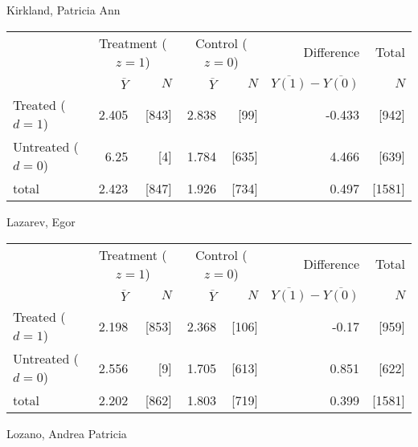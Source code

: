 \documentclass[11pt,notitlepage]{article}
\begin{document}
\clearpage

Kirkland, Patricia Ann

\begin{table}[h!]
\begin{center}
\begin{tabular}{l|rr|rr|rr}
  \hline
 & \multicolumn{2}{c|}{Treatment ($z=1$)} & \multicolumn{2}{c|}{Control ($z=0$)} & Difference & Total \\
 & $\overline{Y}$ & $N$ & $\overline{Y}$ & $N$ & $\overline{Y(1)} - \overline{Y(0)}$ & $N$ \\ 
  \hline
Treated ($d=1$) &  2.405 & [843] & 2.838 & [99] & -0.433 & [942] \\ 
  Untreated ($d=0$) & 6.25 & [4] & 1.784 & [635] & 4.466 & [639] \\ 
  \hline
  total & 2.423 & [847] & 1.926 & [734] & 0.497 & [1581] \\ 
   \hline
\end{tabular}
\end{center}
\end{table}
Lazarev, Egor

\begin{table}[h!]
\begin{center}
\begin{tabular}{l|rr|rr|rr}
  \hline
 & \multicolumn{2}{c|}{Treatment ($z=1$)} & \multicolumn{2}{c|}{Control ($z=0$)} & Difference & Total \\
 & $\overline{Y}$ & $N$ & $\overline{Y}$ & $N$ & $\overline{Y(1)} - \overline{Y(0)}$ & $N$ \\ 
  \hline
Treated ($d=1$) &  2.198 & [853] & 2.368 & [106] & -0.17 & [959] \\ 
  Untreated ($d=0$) & 2.556 & [9] & 1.705 & [613] & 0.851 & [622] \\ 
  \hline
  total & 2.202 & [862] & 1.803 & [719] & 0.399 & [1581] \\ 
   \hline
\end{tabular}
\end{center}
\end{table}
Lozano, Andrea Patricia
\end{document}

